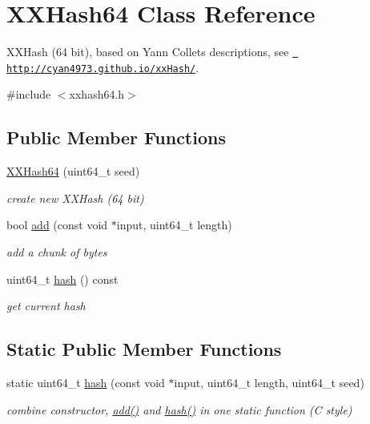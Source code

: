 \hypertarget{class_x_x_hash64}{}\section{X\+X\+Hash64 Class Reference}
\label{class_x_x_hash64}


X\+X\+Hash (64 bit), based on Yann Collet\textquotesingle{}s descriptions, see \href{http://cyan4973.github.io/xxHash/}{\texttt{ http\+://cyan4973.\+github.\+io/xx\+Hash/}}.  




{\ttfamily \#include $<$xxhash64.\+h$>$}

\subsection*{Public Member Functions}
\begin{DoxyCompactItemize}
\item 
\mbox{\hyperlink{class_x_x_hash64_a75750aa9da0608c510cb2770db35754b}{X\+X\+Hash64}} (uint64\+\_\+t seed)
\begin{DoxyCompactList}\small\item\em create new X\+X\+Hash (64 bit) \end{DoxyCompactList}\item 
bool \mbox{\hyperlink{class_x_x_hash64_a150f41ac12eacc49e98b4847e70c871a}{add}} (const void $\ast$input, uint64\+\_\+t length)
\begin{DoxyCompactList}\small\item\em add a chunk of bytes \end{DoxyCompactList}\item 
uint64\+\_\+t \mbox{\hyperlink{class_x_x_hash64_ad7666ede7a694debd1cc018bbd98d21b}{hash}} () const
\begin{DoxyCompactList}\small\item\em get current hash \end{DoxyCompactList}\end{DoxyCompactItemize}
\subsection*{Static Public Member Functions}
\begin{DoxyCompactItemize}
\item 
static uint64\+\_\+t \mbox{\hyperlink{class_x_x_hash64_af555a886b8ae54d6d1a18ecd8e454c6d}{hash}} (const void $\ast$input, uint64\+\_\+t length, uint64\+\_\+t seed)
\begin{DoxyCompactList}\small\item\em combine constructor, \mbox{\hyperlink{class_x_x_hash64_a150f41ac12eacc49e98b4847e70c871a}{add()}} and \mbox{\hyperlink{class_x_x_hash64_ad7666ede7a694debd1cc018bbd98d21b}{hash()}} in one static function (C style) \end{DoxyCompactList}\end{DoxyCompactItemize}


